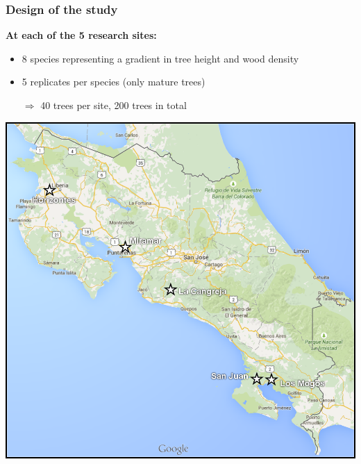 \documentclass[usepdftitle=false]{beamer}
\newcommand{\Rar}{$\Rightarrow$}
\newcommand{\tw}{\textwidth}
\begin{document}
\begin{frame}
	\frametitle{Design of the study}
	\begin{minipage}{0.5\tw}
		\textbf{ At each of the 5 research sites:}
		\begin{itemize}[<+-| alert@+>]
			\item 8 species representing a gradient in tree height and wood density
			\item 5 replicates per species (only mature trees)
			\item[\Rar] 40 trees per site, 200 trees in total
		\end{itemize}	
	\end{minipage}
	\begin{minipage}{0.48\tw}
		\includegraphics[width = \tw]{figures/map_01_all_sites.png}  	
	\end{minipage}
\end{frame}
\end{document}
